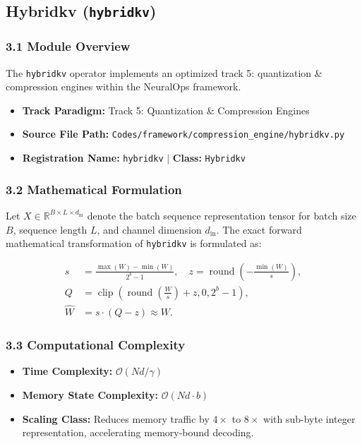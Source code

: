 \subsection{Hybridkv (\texttt{hybridkv})}
\label{sec:app_module_hybridkv}

\subsubsection*{3.1 Module Overview}
The \texttt{hybridkv} operator implements an optimized track 5: quantization \& compression engines within the NeuralOps framework.
\begin{itemize}
    \item \textbf{Track Paradigm:} Track 5: Quantization & Compression Engines
    \item \textbf{Source File Path:} \texttt{Codes/framework/compression\_engine/hybridkv.py}
    \item \textbf{Registration Name:} \texttt{hybridkv} $\mid$ \textbf{Class:} \texttt{Hybridkv}
\end{itemize}

\subsubsection*{3.2 Mathematical Formulation}
Let $X \in \mathbb{R}^{B \times L \times d_{\text{in}}}$ denote the batch sequence representation tensor for batch size $B$, sequence length $L$, and channel dimension $d_{\text{in}}$. The exact forward mathematical transformation of \texttt{hybridkv} is formulated as:

\begin{align}
s &= \frac{\max(W) - \min(W)}{2^b - 1}, \quad z = \operatorname{round}\left(-\frac{\min(W)}{s}\right), \\
Q &= \operatorname{clip}\left(\operatorname{round}\left(\frac{W}{s}\right) + z, 0, 2^b - 1\right), \\
\hat{W} &= s \cdot (Q - z) \approx W.
\end{align}


\subsubsection*{3.3 Computational Complexity}
\begin{itemize}
    \item \textbf{Time Complexity:} $\mathcal{O}(N d / \gamma)$
    \item \textbf{Memory State Complexity:} $\mathcal{O}(N d \cdot b)$
    \item \textbf{Scaling Class:} Reduces memory traffic by $4\times$ to $8\times$ with sub-byte integer representation, accelerating memory-bound decoding.
\end{itemize}

